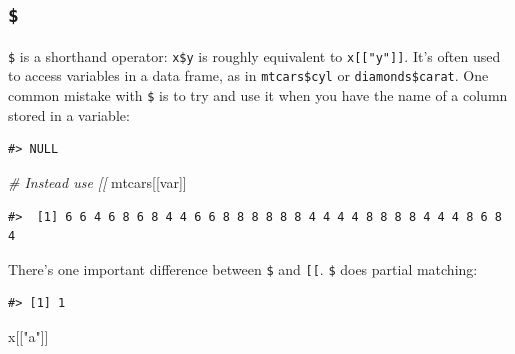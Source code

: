 \documentclass[]{book}
\newenvironment{Shaded}{\begin{snugshade}}{\end{snugshade}}
\newcommand{\KeywordTok}[1]{\textcolor[rgb]{0.13,0.29,0.53}{\textbf{#1}}}
\newcommand{\DataTypeTok}[1]{\textcolor[rgb]{0.13,0.29,0.53}{#1}}
\newcommand{\DecValTok}[1]{\textcolor[rgb]{0.00,0.00,0.81}{#1}}
\newcommand{\StringTok}[1]{\textcolor[rgb]{0.31,0.60,0.02}{#1}}
\newcommand{\CommentTok}[1]{\textcolor[rgb]{0.56,0.35,0.01}{\textit{#1}}}
\newcommand{\OperatorTok}[1]{\textcolor[rgb]{0.81,0.36,0.00}{\textbf{#1}}}
\newcommand{\NormalTok}[1]{#1}
\theoremstyle{definition}
\theoremstyle{definition}
\theoremstyle{definition}
\theoremstyle{remark}
\begin{document}
\subsection{\texorpdfstring{\texttt{\$}}{\$}}\label{section}

\texttt{\$} is a shorthand operator: \texttt{x\$y} is roughly equivalent
to \texttt{x{[}{[}"y"{]}{]}}. It's often used to access variables in a
data frame, as in \texttt{mtcars\$cyl} or \texttt{diamonds\$carat}. One
common mistake with \texttt{\$} is to try and use it when you have the
name of a column stored in a variable:

\begin{Shaded}
\end{Shaded}

\begin{verbatim}
#> NULL
\end{verbatim}

\begin{Shaded}
\begin{Highlighting}[]
\CommentTok{# Instead use [[}
\NormalTok{mtcars[[var]]}
\end{Highlighting}
\end{Shaded}

\begin{verbatim}
#>  [1] 6 6 4 6 8 6 8 4 4 6 6 8 8 8 8 8 8 4 4 4 4 8 8 8 8 4 4 4 8 6 8 4
\end{verbatim}

There's one important difference between \texttt{\$} and
\texttt{{[}{[}}. \texttt{\$} does partial matching:

\begin{Shaded}
\end{Shaded}

\begin{verbatim}
#> [1] 1
\end{verbatim}

\begin{Shaded}
\begin{Highlighting}[]
\NormalTok{x[[}\StringTok{"a"}\NormalTok{]]}
\end{Highlighting}
\end{Shaded}
\end{document}
